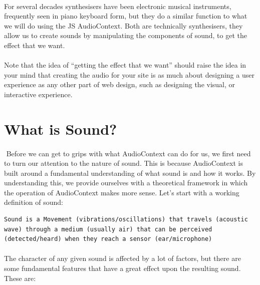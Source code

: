 \paragraph{} For several decades synthesisers have been electronic musical instruments, frequently seen in piano keyboard form, but they do a similar function to what we will do using the JS AudioContext. Both are technically synthesisers, they allow us to create sounds by manipulating the components of sound, to get the effect that we want.
\paragraph{} Note that the idea of ``getting the effect that we want'' should raise the idea in your mind that creating the audio for your site is as much about designing a user experience as any other part of web design, such as designing the visual, or interactive experience.


\section{What is Sound?}
\paragraph{} Before we can get to grips with what AudioContext can do for us, we first need to turn our attention to the nature of sound. This is because AudioContext is built around a fundamental understanding of what sound is and how it works. By understanding this, we provide ourselves with a theoretical framework in which the operation of AudioContext makes more sense. Let's start with a working definition of sound:
\begin{verbatim}
Sound is a Movement (vibrations/oscillations) that travels (acoustic wave) through a medium (usually air) that can be perceived (detected/heard) when they reach a sensor (ear/microphone)
\end{verbatim}
\paragraph{} The character of any given sound is affected by a lot of factors, but there are some fundamental features that have a great effect upon the resulting sound. These are:

